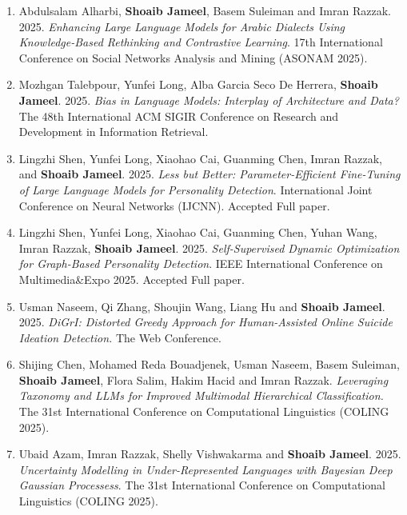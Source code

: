 \documentclass[margin]{res}
\begin{document}
\begin{resume}
\begin{enumerate}
\item Abdulsalam Alharbi, \textbf{Shoaib Jameel}, Basem Suleiman and Imran Razzak. 2025. \textit{Enhancing Large Language Models for Arabic Dialects Using Knowledge-Based Rethinking and Contrastive Learning}. 17th International Conference on Social Networks Analysis and Mining (ASONAM 2025). \\

\item Mozhgan Talebpour, Yunfei Long, Alba	Garcia Seco De Herrera, \textbf{Shoaib Jameel}. 2025. \textit{Bias in Language Models: Interplay of Architecture and Data?} The 48th International ACM SIGIR Conference on Research and Development in Information Retrieval. \\

\item Lingzhi Shen, Yunfei Long, Xiaohao Cai, Guanming Chen, Imran Razzak, and \textbf{Shoaib Jameel}. 2025. \textit{Less but Better: Parameter-Efficient Fine-Tuning of Large Language Models for Personality Detection}. International Joint Conference on Neural Networks (IJCNN). Accepted Full paper. \\

\item Lingzhi Shen, Yunfei Long, Xiaohao Cai, Guanming Chen, Yuhan Wang, Imran Razzak, \textbf{Shoaib Jameel}. 2025. \textit{Self-Supervised Dynamic Optimization for Graph-Based Personality Detection}. IEEE International Conference on Multimedia\&Expo 2025. Accepted Full paper. \\

\item Usman Naseem, Qi Zhang, Shoujin Wang, Liang Hu and \textbf{Shoaib Jameel}. 2025. \textit{DiGrI: Distorted Greedy Approach for Human-Assisted Online Suicide Ideation Detection.} The Web Conference. \\

\item Shijing Chen, Mohamed Reda Bouadjenek, Usman Naseem, Basem Suleiman, \textbf{Shoaib Jameel}, Flora Salim, Hakim Hacid and Imran Razzak. \textit{Leveraging Taxonomy and LLMs for Improved Multimodal Hierarchical Classification.} The 31st International Conference on Computational Linguistics (COLING 2025). \newline

\item Ubaid Azam, Imran Razzak, Shelly Vishwakarma and \textbf{Shoaib Jameel}. 2025. \textit{Uncertainty Modelling in Under-Represented Languages with Bayesian Deep Gaussian Processess}. The 31st International Conference on Computational Linguistics (COLING 2025). \newline


\end{enumerate}
\end{resume}
\end{document}
